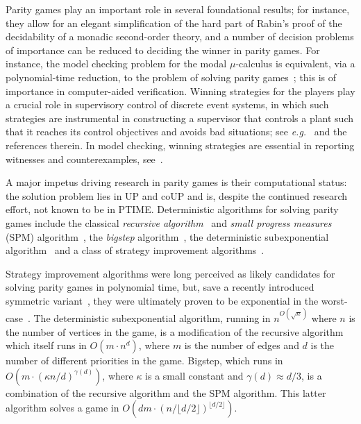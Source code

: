 \documentclass{eptcs}
\newcommand{\eg}{\emph{e.g.}\xspace}
\def\runtimefloor{O(dm \cdot (n/\lfloor d / 2 \rfloor)^{\lfloor d/2 \rfloor})}
\begin{document}
Parity games play an important role in several foundational results;
for instance, they allow for an elegant simplification of the hard
part of Rabin's proof of the decidability of a monadic second-order
theory, and a number of decision problems of importance can be
reduced to deciding the winner in parity games. For instance, the
model checking problem for the modal $\mu$-calculus is equivalent,
via a polynomial-time reduction, to the problem of solving parity
games~\cite{EJS:93,SS:98}; this is of importance in computer-aided
verification.  Winning strategies for the players play a crucial
role in supervisory control of discrete event systems, in which
such strategies are instrumental in constructing a supervisor that
controls a plant such that it reaches its control objectives and
avoids bad situations; see \eg~\cite{AVW:03} and the references
therein. In model checking, winning strategies are essential in
reporting witnesses and counterexamples, see~\cite{SS:98}.\medskip

A major impetus driving research in parity games is their computational
status: the solution problem lies in UP and coUP and is, despite
the continued research effort, not known to be in PTIME.  
Deterministic algorithms for solving parity games include the
classical \emph{recursive algorithm}~\cite{Zie:98} and
\emph{small progress measures} (SPM) algorithm~\cite{Jur:00}, the
\emph{bigstep} algorithm~\cite{Sch:07}, the deterministic subexponential
algorithm~\cite{JPZ:06} and a class of strategy improvement
algorithms~\cite{VJ:00,Sch:08,Fea:10}.

Strategy improvement algorithms were long perceived as likely
candidates for solving parity games in polynomial time, but, save
a recently introduced symmetric variant~\cite{STV:15}, they were
ultimately proven to be exponential in the worst-case~\cite{Fri:11}.
The deterministic subexponential algorithm, running in $n^{O(\sqrt{n})}$
where $n$ is the number of vertices in the game, is a modification
of the recursive algorithm which
itself runs in $O(m \cdot n^d)$, where $m$ is the number of edges
and $d$ is the number of different priorities in the game. Bigstep,
which runs in $O(m \cdot (\kappa n /d)^{\gamma(d)})$, where $\kappa$
is a small constant and $\gamma(d) \approx d/3$, is a combination
of the recursive algorithm and 
the SPM algorithm.
This latter algorithm solves a game in $\runtimefloor$.
\end{document}

